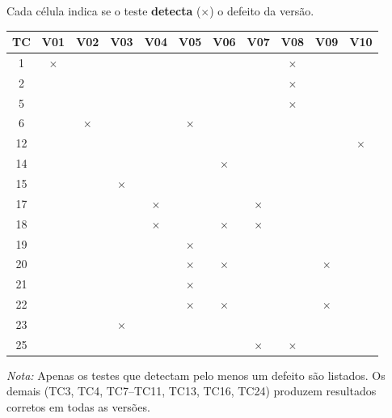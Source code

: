 \documentclass[12pt,a4paper]{article}
\begin{document}
\begin{tcolorbox}[colback=red!5, colframe=red!40, title=\textbf{Matriz de Detecção (Kill Matrix)}, fonttitle=\small]
\small
Cada célula indica se o teste \textbf{detecta} ($\times$) o defeito da versão.

\begin{center}
\setlength{\tabcolsep}{3pt}
\begin{tabular}{c|cccccccccc}
\toprule
\textbf{TC} & \textbf{V01} & \textbf{V02} & \textbf{V03} & \textbf{V04} & \textbf{V05} & \textbf{V06} & \textbf{V07} & \textbf{V08} & \textbf{V09} & \textbf{V10} \\
\midrule
1  & $\times$ & & & & & & & $\times$ & & \\
2  & & & & & & & & $\times$ & & \\
5  & & & & & & & & $\times$ & & \\
6  & & $\times$ & & & $\times$ & & & & & \\
12 & & & & & & & & & & $\times$ \\
14 & & & & & & $\times$ & & & & \\
15 & & & $\times$ & & & & & & & \\
17 & & & & $\times$ & & & $\times$ & & & \\
18 & & & & $\times$ & & $\times$ & $\times$ & & & \\
19 & & & & & $\times$ & & & & & \\
20 & & & & & $\times$ & $\times$ & & & $\times$ & \\
21 & & & & & $\times$ & & & & & \\
22 & & & & & $\times$ & $\times$ & & & $\times$ & \\
23 & & & $\times$ & & & & & & & \\
25 & & & & & & & $\times$ & $\times$ & & \\
\bottomrule
\end{tabular}
\end{center}

\textit{Nota:} Apenas os testes que detectam pelo menos um defeito são listados. Os demais (TC3, TC4, TC7--TC11, TC13, TC16, TC24) produzem resultados corretos em todas as versões.

\end{tcolorbox}

\fi %
\end{document}
